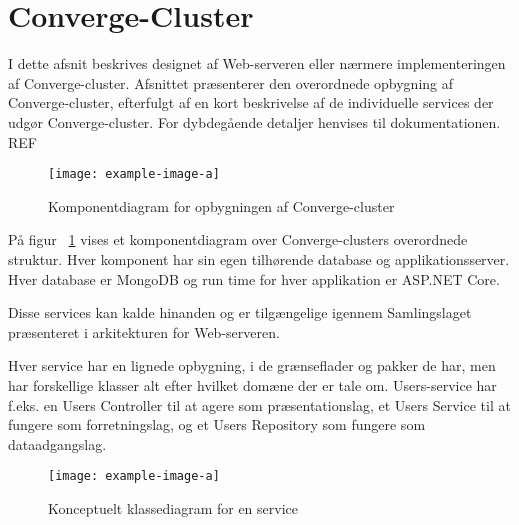 \section{Converge-Cluster}

I dette afsnit beskrives designet af Web-serveren eller nærmere implementeringen af Converge-cluster. Afsnittet præsenterer den overordnede opbygning af Converge-cluster, efterfulgt af en kort beskrivelse af de individuelle services der udgør Converge-cluster. For dybdegående detaljer henvises til dokumentationen. REF


\begin{figure}
  \begin{small}
    \begin{center}
      \texttt{[image: example-image-a]}
    \end{center}
    \caption{Komponentdiagram for opbygningen af Converge-cluster}
    \label{fig:component-converge-cluster}
  \end{small}
\end{figure}

På figur ~\ref{fig:component-converge-cluster} vises et komponentdiagram over Converge-clusters overordnede struktur. Hver komponent har sin egen tilhørende database og applikationsserver. Hver database er MongoDB og run time for hver applikation er ASP.NET Core.

Disse services kan kalde hinanden og er tilgængelige igennem Samlingslaget præsenteret i arkitekturen for Web-serveren.

Hver service har en lignede opbygning, i de grænseflader og pakker de har, men har forskellige klasser alt efter hvilket domæne der er tale om. Users-service har f.eks. en Users Controller til at agere som præsentationslag, et Users Service til at fungere som forretningslag, og et Users Repository som fungere som dataadgangslag.



\begin{figure}
  \begin{small}
    \begin{center}
      \texttt{[image: example-image-a]}
    \end{center}
    \caption{Konceptuelt klassediagram for en service}
    \label{fig:conceptual-class-service}
  \end{small}
\end{figure}

